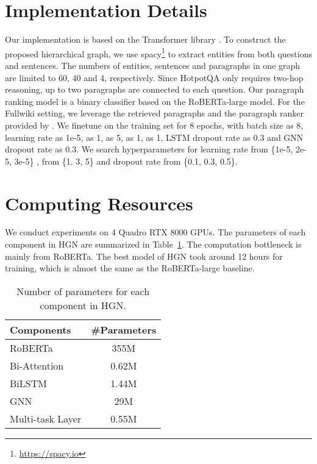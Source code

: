 \documentclass[11pt,a4paper]{article}
\begin{document}
\section{Implementation Details}
\label{appendix:implementation}
Our implementation is based on the Transformer library \cite{wolf2019transformers}.
To construct the proposed hierarchical graph, we use spacy\footnote{\href{https://spacy.io}{https://spacy.io}} to extract entities from both questions and sentences. The numbers of entities, sentences and paragraphs in one graph are limited to 60, 40 and 4, respectively. Since HotpotQA only requires two-hop reasoning, up to two paragraphs are connected to each question. 
Our paragraph ranking model is a binary classifier based on the RoBERTa-large model. For the Fullwiki setting, we leverage the retrieved paragraphs and the paragraph ranker provided by \citet{nie2019revealing}.
We finetune on the training set for 8 epochs, with batch size as 8, learning rate as 1e-5,  as 1,  as 5,   as 1,  as 1, LSTM dropout rate as 0.3 and  GNN dropout rate as 0.3.
We search hyperparameters for learning rate from \{1e-5, 2e-5, 3e-5\} ,  from \{1, 3, 5\} and dropout rate from \{0.1, 0.3, 0.5\}.

\section{Computing Resources}
We conduct experiments on 4 Quadro RTX 8000 GPUs. The parameters of each component in HGN are summarized in Table~\ref{table:resources}. The computation bottleneck is mainly from RoBERTa. The best model of HGN took around 12 hours for training, which is almost the same as the RoBERTa-large baseline. 
\begin{table}[h!]
\centering
\begin{adjustbox}{scale=0.95,center}
\begin{tabular}{lc}
\hline
Components & \#Parameters \\ \hline
RoBERTa & 355M  \\
Bi-Attention & 0.62M \\
BiLSTM & 1.44M \\
GNN & 29M \\
Multi-task Layer & 0.55M \\ \hline
\end{tabular}
\end{adjustbox}
\caption{\label{table:resources} Number of parameters for each component in HGN.}
\end{table}
\end{document}
